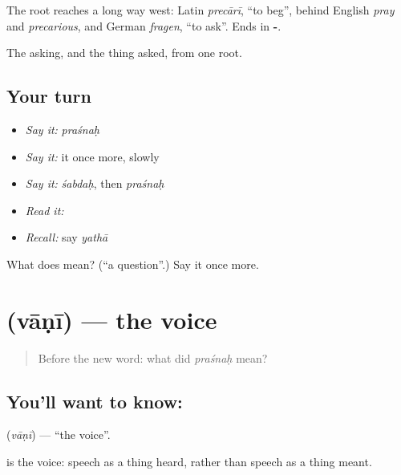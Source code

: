 The root reaches a long way west: Latin \emph{precārī}, \textquotedblleft{}to beg\textquotedblright{}, behind English \emph{pray} and \emph{precarious}, and German \emph{fragen}, \textquotedblleft{}to ask\textquotedblright{}. Ends in \textbf{-}.

\begin{grammarlens}[title={What you've built}]
The asking, and the thing asked, from one root.
\end{grammarlens}

\subsection*{Your turn}
\begin{itemize}
\raggedright
  \item \emph{Say it:} \emph{praśnaḥ}
  \item \emph{Say it:} it once more, slowly
  \item \emph{Say it:} \emph{śabdaḥ}, then \emph{praśnaḥ}
  \item \emph{Read it:} \textbf{}
  \item \emph{Recall:} say \emph{yathā}
\end{itemize}

\begin{tcolorbox}[breakable,colback=teal!4,colframe=teal!35!black,title={Before you move on}]
What does  mean? (\textquotedblleft{}a question\textquotedblright{}.) Say it once more.
\end{tcolorbox}
\section[\texorpdfstring{\sk{वाणी} (vāṇī)}{वाणी (vāṇī)}]{ (vāṇī) — the voice}

\label{lesson:SA-C50-voice}



\begin{quote}
Before the new word: what did \emph{praśnaḥ} mean?
\end{quote}

\subsection*{You'll want to know: }
\textbf{} (\emph{vāṇī}) — \textquotedblleft{}the voice\textquotedblright{}.

\textbf{} is the voice: speech as a thing heard, rather than speech as a thing meant.

